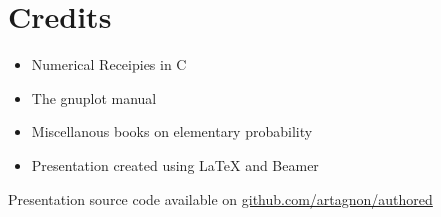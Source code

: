 \section{Credits}
\frame
{
  \begin{itemize}
  \item Numerical Receipies in C
  \item The gnuplot manual
  \item Miscellanous books on elementary probability
  \item Presentation created using \LaTeX{} and Beamer
  \end{itemize}
  \small
  Presentation source code available on \href{http://github.com/artagnon/authored}{github.com/artagnon/authored}
}

